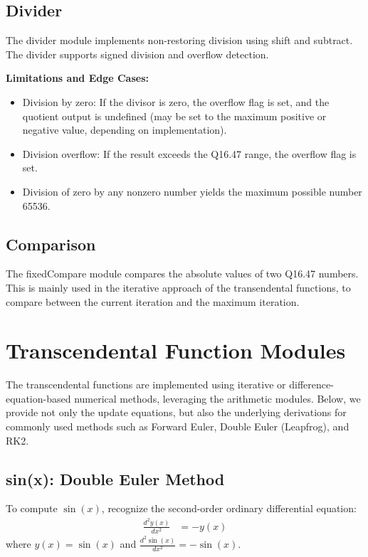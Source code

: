 \documentclass[conference]{IEEEtran}
\begin{document}
\begin{FlushLeft}
\subsection{Divider}
The divider module implements non-restoring division using shift and subtract.
The divider supports signed division and overflow detection.

\textbf{Limitations and Edge Cases:}
\begin{itemize}
    \item Division by zero: If the divisor is zero, the overflow flag is set, and the quotient output is undefined (may be set to the maximum positive or negative value, depending on implementation).
    \item Division overflow: If the result exceeds the Q16.47 range, the overflow flag is set.
    \item Division of zero by any nonzero number yields the maximum possible number 65536.
\end{itemize}


\subsection{Comparison}
The fixedCompare module compares the absolute values of two Q16.47 numbers. This is mainly used in the iterative approach of the transendental functions, to compare between the current iteration and the maximum iteration.

\section{Transcendental Function Modules}
\begin{flushleft}
The transcendental functions are implemented using iterative or difference-equation-based numerical methods, leveraging the arithmetic modules. Below, we provide not only the update equations, but also the underlying derivations for commonly used methods such as Forward Euler, Double Euler (Leapfrog), and RK2.

\subsection{sin(x): Double Euler Method}
To compute \(\sin(x)\), recognize the second-order ordinary differential equation:
\begin{align*}
	\frac{d^2 y(x)}{dx^2} &= -y(x)
\end{align*}
where \(y(x) = \sin(x)\) and \(\frac{d^2 \sin(x)}{dx^2} = -\sin(x)\).


\end{flushleft}
\end{FlushLeft}
\end{document}
